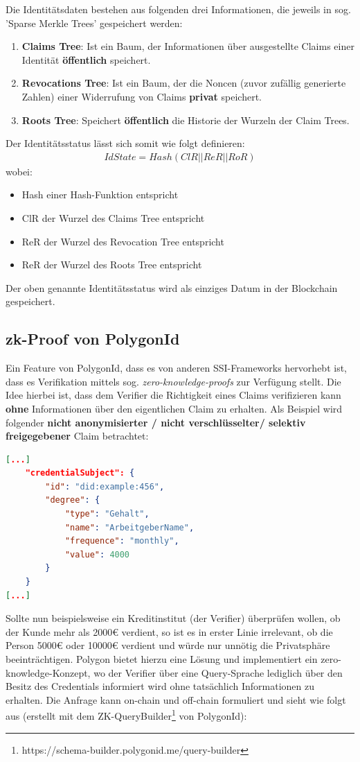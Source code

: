 Die Identitätsdaten bestehen aus folgenden drei Informationen, die jeweils in sog. 'Sparse Merkle Trees' gespeichert werden:
\begin{enumerate}
	\item \textbf{Claims Tree}: Ist ein Baum, der Informationen über ausgestellte Claims einer Identität \textbf{öffentlich} speichert.
	\item \textbf{Revocations Tree}: Ist ein Baum, der die Noncen (zuvor zufällig generierte Zahlen) einer Widerrufung von Claims \textbf{privat} speichert.
	\item \textbf{Roots Tree}: Speichert \textbf{öffentlich} die Historie der Wurzeln der Claim Trees.
\end{enumerate}
Der Identitätsstatus lässt sich somit wie folgt definieren:
\begin{align}
	IdState = Hash(ClR || ReR || RoR)
\end{align}
wobei:
\begin{itemize}
	\item Hash einer Hash-Funktion entspricht
	\item ClR der Wurzel des Claims Tree entspricht
	\item ReR der Wurzel des Revocation Tree entspricht
	\item ReR der Wurzel des Roots Tree entspricht
\end{itemize}
Der oben genannte Identitätsstatus wird als einziges Datum in der Blockchain gespeichert.

\subsection{zk-Proof von PolygonId}
Ein Feature von PolygonId, dass es von anderen SSI-Frameworks hervorhebt ist, dass es Verifikation mittels sog. \textsl{zero-knowledge-proofs} zur Verfügung stellt. Die Idee hierbei ist, dass dem Verifier die Richtigkeit eines Claims verifizieren kann \textbf{ohne} Informationen über den eigentlichen Claim zu erhalten. Als Beispiel wird folgender \textbf{nicht anonymisierter / nicht verschlüsselter/ selektiv freigegebener} Claim betrachtet:
\begin{lstlisting}[language=json,firstnumber=1]	
[...]
	"credentialSubject": {	
		"id": "did:example:456",	
		"degree": {		
			"type": "Gehalt",		
			"name": "ArbeitgeberName",		
			"frequence": "monthly",
			"value": 4000	
		}	
	}
[...]
\end{lstlisting}
Sollte nun beispielsweise ein Kreditinstitut (der Verifier) überprüfen wollen, ob der Kunde mehr als 2000€ verdient, so ist es in erster Linie irrelevant, ob die Person 5000€ oder 10000€ verdient und würde nur unnötig die Privatsphäre beeinträchtigen. Polygon bietet hierzu eine Lösung und implementiert ein zero-knowledge-Konzept, wo der Verifier über eine Query-Sprache lediglich über den Besitz des Credentials informiert wird ohne tatsächlich Informationen zu erhalten.
Die Anfrage kann on-chain und off-chain formuliert und sieht wie folgt aus (erstellt mit dem ZK-QueryBuilder\footnote{https://schema-builder.polygonid.me/query-builder} von PolygonId):

